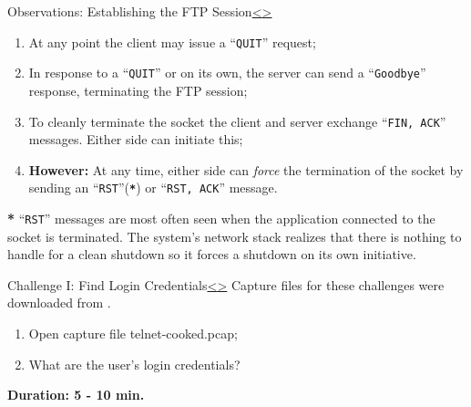 \documentclass[12pt]{extarticle}
\newenvironment{instructionblock}{\Large\bgroup}{\egroup}
\begin{document}
	\pagebreak
	\begin{slide}{Observations: Establishing the FTP Session}{\hyperref[slide 21]{\textless}\hyperref[slide 23]{\textgreater}}
		\begin{instructionblock}
			\begin{enumerate}
				\item At any point the client may issue a ``\texttt{QUIT}'' request;
				\item In response to a ``\texttt{QUIT}'' or on its own, the server can send a ``\texttt{Goodbye}'' response, terminating the FTP session;
				\item To cleanly terminate the socket the client and server exchange ``\texttt{FIN, ACK}'' messages.  Either side can initiate this;
				\item \textbf{However:} At any time, either side can \textit{force} the termination of the socket by sending an ``\texttt{RST}''(\textbf{\texttt{*}}) or ``\texttt{RST, ACK}'' message.
			\end{enumerate}
		\end{instructionblock}
	\end{slide}
	
	\vspace{4mm}
	\noindent
	{\textbf{*}} ``\texttt{RST}'' messages are most often seen when the application connected to the socket is terminated.  The system's network stack realizes that there is nothing to handle for a clean shutdown so it forces a shutdown on its own initiative.
	
	
	
	
	\pagebreak
	\begin{slide}{Challenge I: Find Login Credentials}{\hyperref[slide 22]{\textless}\hyperref[slide 24]{\textgreater}}
		\vskip 5pt
		\begin{instructionblock}
			Capture files for these challenges were downloaded from \cite{sampleCaps}.
			\begin{enumerate}
				\item Open capture file telnet-cooked.pcap;
				\item What are the user's login credentials?
			\end{enumerate}
			
			\vspace{35mm}
			\begin{center}
				 \textbf{Duration: 5 - 10 min.}
			\end{center}
		\end{instructionblock}
	\end{slide}
	\vfill
	
\end{document}
